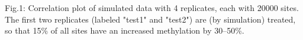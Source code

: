 Fig.1: Correlation plot of simulated data with 4 replicates, each with 20000 sites. The first two replicates (labeled "test1" and "test2") are (by simulation) treated, so that 15\% of all sites have an increased methylation by 30--50\%.